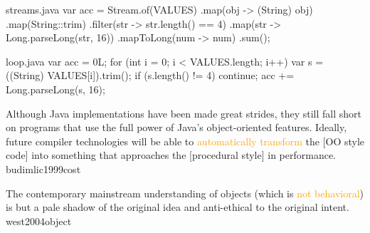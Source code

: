 \documentclass{article}
\newcommand\hlt[1]{\textcolor{orange}{#1}}
\newenvironment{xcode}[1][xcode.txt]
  {\VerbatimEnvironment\begin{VerbatimOut}{#1}}
  {\end{VerbatimOut}}
\begin{document}
\begin{xcode}[streams.java]
var acc = Stream.of(VALUES)
  .map(obj -> (String) obj)
  .map(String::trim)
  .filter(str -> str.length() == 4)
  .map(str -> Long.parseLong(str, 16))
  .mapToLong(num -> num)
  .sum();
\end{xcode}
\begin{xcode}[loop.java]
var acc = 0L;
for (int i = 0; i < VALUES.length; i++) {
  var s = ((String) VALUES[i]).trim();
  if (s.length() != 4) continue;
  acc += Long.parseLong(s, 16);
}
\end{xcode}


  {Although Java implementations have been made great strides, they still fall short on programs that use the full power of Java’s object-oriented features. Ideally, future compiler technologies will be able to \hlt{automatically transform} the [OO style code] into something that approaches the [procedural style] in performance.}
  {budimlic1999cost}


  {The contemporary mainstream understanding of objects (which is \hlt{not behavioral}) is but a pale shadow of the original idea and anti-ethical to the original intent.}
  {west2004object}
\end{document}
